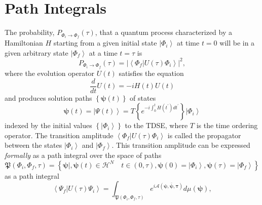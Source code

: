 \documentclass[aps,preprint]{revtex4}%
\begin{document}
\section{Path Integrals\label{pathinteg}}

The probability, $P_{\Phi_{i}\rightarrow\Phi_{f}}\left(  \tau\right)  $, that
a quantum process characterized by a Hamiltonian $H$ starting from a given
initial state $\left\vert \Phi_{i}\right\rangle $ at time $t=0$ will be in a
given arbitrary state $\left\vert \Phi_{f}\right\rangle $ at a time $t=\tau$
is
\begin{equation}
P_{\Phi_{i}\rightarrow\Phi_{f}}\left(  \tau\right)  =\left\vert \left\langle
\Phi_{f}\left\vert U\left(  \tau\right)  \right.  \Phi_{i}\right\rangle
\right\vert ^{2},
\end{equation}
where the evolution operator $U\left(  t\right)  $ satisfies the equation
\begin{equation}
\frac{d}{dt}U\left(  t\right)  =-iH\left(  t\right)  U\left(  t\right)
\end{equation}
and produces solution paths $\left\{  \mathbf{\psi}\left(  t\right)  \right\}
$ of states%
\begin{equation}
\mathbf{\psi}\left(  t\right)  =\left\vert \Psi\left(  t\right)  \right\rangle
=T\left\{  e^{-i\int_{0}^{t}H\left(  t^{\prime}\right)  dt^{\prime}}\right\}
\left\vert \Phi_{i}\right\rangle
\end{equation}
indexed by the initial values $\left\{  \left\vert \Phi_{i}\right\rangle
\right\}  $ to the TDSE, where $T$ is the time ordering operator. The
transition amplitude $\left\langle \Phi_{f}\left\vert U\left(  \tau\right)
\right.  \Phi_{i}\right\rangle $ is called the propagator between the states
$\left\vert \Phi_{i}\right\rangle $ and $\left\vert \Phi_{f}\right\rangle $.
This transition amplitude can be expressed \emph{formally} as a path integral
over the space of paths
\begin{equation}
\mathfrak{P}\left(  \Phi_{i},\Phi_{f},\tau\right)  =\left\{  \left.
\mathbf{\psi}\right\vert ,\mathbf{\psi}\left(  t\right)  \in\mathcal{H}%
^{N}\quad t\in\left(  0,\tau\right)  ,\mathbf{\psi}\left(  0\right)
=\left\vert \Phi_{i}\right\rangle ,\mathbf{\psi}\left(  \tau\right)
=\left\vert \Phi_{f}\right\rangle \right\}
\end{equation}
as a path integral%
\begin{equation}
\left\langle \Psi_{f}\left\vert U\left(  \tau\right)  \right.  \Psi
_{i}\right\rangle =\int_{\mathfrak{P}\left(  \Phi_{i},\Phi_{f},\tau\right)
}e^{i\mathcal{A}\left(  \mathbf{\psi,\bar{\psi},\tau}\right)  }d\mu\left(
\mathbf{\psi}\right)  ,
\end{equation}
\end{document}
